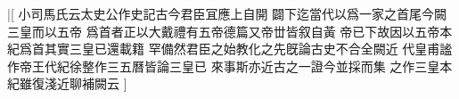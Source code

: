|[%
小司馬氏云太史公作史記古今君臣冝應上自開%
闢下迄當代以爲一家之首尾今闕三皇而以五帝%
%
爲首者正以大戴禮有五帝德篇又帝丗皆叙自黃%
帝已下故因以五帝本紀爲首其實三皇已還載籍%
%
罕備然君臣之始教化之先旣論古史不合全闕近%
代皇甫謐作帝王代紀徐整作三五曆皆論三皇已%
%
來事斯亦近古之一證今並採而集%
之作三皇本紀雖復淺近聊補闕云%
]%
